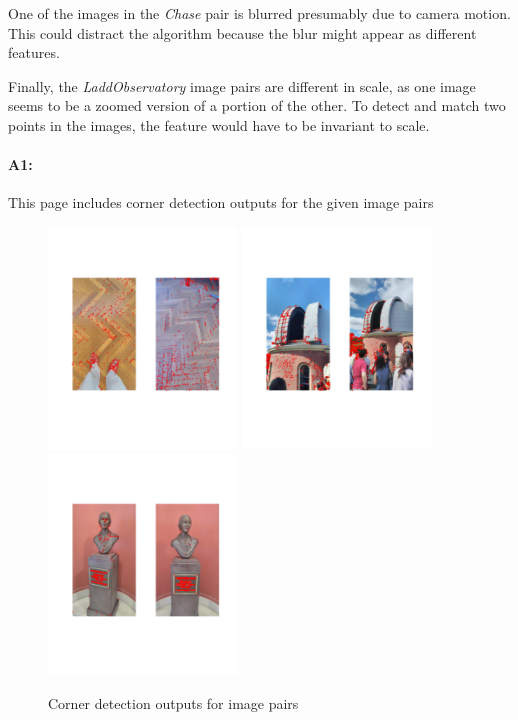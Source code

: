 One of the images in the \emph{Chase} pair is blurred presumably due to camera motion. This could distract the algorithm because the blur might appear as different features.

Finally, the \emph{LaddObservatory} image pairs are different in scale, as one image seems to be a zoomed version of a portion of the other. To detect and match two points in the images, the feature would have to be invariant to scale.

\pagebreak
\paragraph{A1:} This page includes corner detection outputs for the given image pairs

\begin{figure}[h]
    \centering
    \includegraphics[width=5cm]{outputs/Library.jpg}
    \includegraphics[width=5cm]{outputs/Observatory.jpg}
    \includegraphics[width=5cm]{outputs/Chase.jpg}
    \caption{Corner detection outputs for image pairs}
    \label{fig:result1}
\end{figure}

